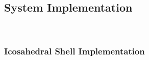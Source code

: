 \subsection{System Implementation}

\

\subsubsection{Icosahedral Shell Implementation}
\label{sec:icos_construction}
